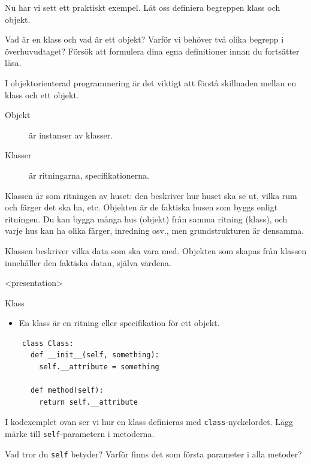 Nu har vi sett ett praktiskt exempel. Låt oss definiera begreppen klass och
objekt.

\begin{exercise}
  Vad är en klass och vad är ett objekt?
  Varför vi behöver två olika begrepp i överhuvudtaget?
  Försök att formulera dina egna definitioner innan du fortsätter läsa.
\end{exercise}

I objektorienterad programmering är det viktigt att förstå skillnaden mellan en 
klass och ett objekt.
\begin{description}
  \item[Objekt] är instanser av klasser.
  \item[Klasser] är ritningarna, specifikationerna.
\end{description}

Klassen är som ritningen av huset: den beskriver hur huset ska se ut, vilka rum 
och färger det ska ha, etc. Objekten är de faktiska husen som byggs enligt 
ritningen. Du kan bygga många hus (objekt) från samma ritning (klass), och 
varje hus kan ha olika färger, inredning osv., men grundstrukturen är densamma.

Klassen beskriver vilka data som ska vara med.
Objekten som skapas från klassen innehåller den faktiska datan, själva värdena.

\begin{frame}[fragile]
  \begin{onlyenv}<presentation>
  \begin{block}{Klass}
    \begin{itemize}
      \item En klass är en ritning eller specifikation för ett objekt.
    \end{itemize}
  \end{block}
\end{onlyenv}

  \begin{verbatim}
    class Class:
      def __init__(self, something):
        self.__attribute = something

      def method(self):
        return self.__attribute
  \end{verbatim}
\end{frame}

I kodexemplet ovan ser vi hur en klass definieras med 
\texttt{class}-nyckelordet. Lägg märke till 
\texttt{self}-parametern i metoderna.

\begin{exercise}
  Vad tror du \texttt{self} betyder? Varför finns det som 
  första parameter i alla metoder?
\end{exercise}

